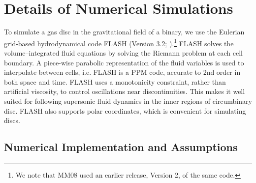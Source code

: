 \section{Details of Numerical Simulations}
\label{Details of Numerical Simulations}

To simulate a gas disc in the gravitational field of a binary, we use
the Eulerian grid-based hydrodynamical code FLASH (Version 3.2;
\citealt{Fryxell:2000}).\footnote{We note that MM08 used an earlier
release, Version 2, of the same code.}  FLASH solves the
volume--integrated fluid equations by solving the Riemann 
problem at each cell boundary. A piece-wise parabolic representation
of the fluid variables is used to interpolate between cells, i.e.
FLASH is a PPM code, accurate to 2nd order in both space and
time. FLASH uses a monotonicity constraint, rather than artificial
viscosity, to control oscillations near discontinuities.  This makes
it well suited for following supersonic fluid dynamics in the inner
regions of circumbinary disc. FLASH also supports polar coordinates,
which is convenient for simulating discs.

\subsection{Numerical Implementation and Assumptions}
\label{Numerical Implementation and Assumptions}

